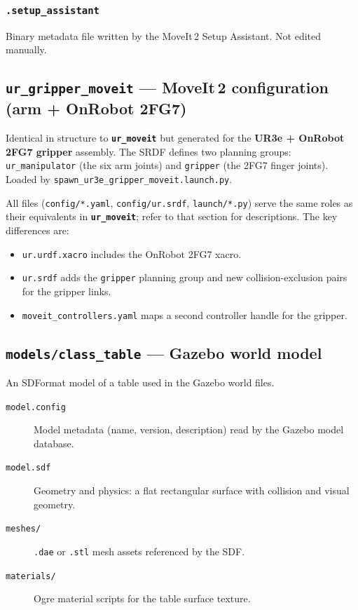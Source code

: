 \documentclass[11pt,a4paper]{article}
\newcommand{\pkg}[1]{\texttt{\textbf{#1}}}
\newcommand{\file}[1]{\texttt{#1}}
\begin{document}
\subsubsection{\file{.setup\_assistant}}

Binary metadata file written by the MoveIt\,2 Setup Assistant.
Not edited manually.

\subsection{\texttt{ur\_gripper\_moveit} --- MoveIt\,2 configuration (arm + OnRobot 2FG7)}

Identical in structure to \pkg{ur\_moveit} but generated for the
\textbf{UR3e + OnRobot 2FG7 gripper} assembly. The SRDF defines two planning
groups: \texttt{ur\_manipulator} (the six arm joints) and \texttt{gripper}
(the 2FG7 finger joints). Loaded by
\file{spawn\_ur3e\_gripper\_moveit.launch.py}.

All files (\file{config/*.yaml}, \file{config/ur.srdf}, \file{launch/*.py})
serve the same roles as their equivalents in \pkg{ur\_moveit}; refer to
that section for descriptions. The key differences are:
\begin{itemize}
  \item \file{ur.urdf.xacro} includes the OnRobot 2FG7 xacro.
  \item \file{ur.srdf} adds the \texttt{gripper} planning group and new
        collision-exclusion pairs for the gripper links.
  \item \file{moveit\_controllers.yaml} maps a second controller handle for
        the gripper.
\end{itemize}

\subsection{\texttt{models/class\_table} --- Gazebo world model}

An SDFormat model of a table used in the Gazebo world files.

\begin{description}
  \item[\file{model.config}]
    Model metadata (name, version, description) read by the Gazebo model
    database.
  \item[\file{model.sdf}]
    Geometry and physics: a flat rectangular surface with collision and
    visual geometry.
  \item[\file{meshes/}]
    \texttt{.dae} or \texttt{.stl} mesh assets referenced by the SDF.
  \item[\file{materials/}]
    Ogre material scripts for the table surface texture.
\end{description}
\end{document}
